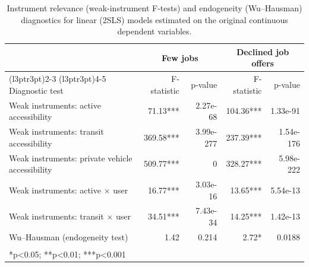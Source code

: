 \documentclass[preprint, 3p,
authoryear]{elsarticle} %
\begin{document}
\begin{table}[H]
\centering
\caption{\label{tab:unnamed-chunk-6}\label{tab:iv-diagnostics}Instrument relevance (weak-instrument F-tests) and endogeneity (Wu--Hausman) diagnostics for linear (2SLS) models estimated on the original continuous dependent variables.}
\centering
\begin{tabular}[t]{lrrrr}
\toprule
\multicolumn{1}{c}{ } & \multicolumn{2}{c}{Few jobs} & \multicolumn{2}{c}{Declined job offers} \\
\cmidrule(l{3pt}r{3pt}){2-3} \cmidrule(l{3pt}r{3pt}){4-5}
Diagnostic test & F-statistic & p-value & F-statistic & p-value\\
\midrule
Weak instruments: active accessibility & 71.13*** & 2.27e-68 & 104.36*** & 1.33e-91\\
Weak instruments: transit accessibility & 369.58*** & 3.99e-277 & 237.39*** & 1.54e-176\\
Weak instruments: private vehicle accessibility & 509.77*** & 0 & 328.27*** & 5.98e-222\\
Weak instruments: active × user & 16.77*** & 3.03e-16 & 13.65*** & 5.54e-13\\
Weak instruments: transit × user & 34.51*** & 7.43e-34 & 14.25*** & 1.42e-13\\
\addlinespace
Wu–Hausman (endogeneity test) & 1.42 & 0.214 & 2.72* & 0.0188\\
\bottomrule
\multicolumn{5}{l}{\textsuperscript{} *p<0.05; **p<0.01; ***p<0.001}\\
\end{tabular}
\end{table}

\renewcommand{\thetable}{A.3}
\end{document}
